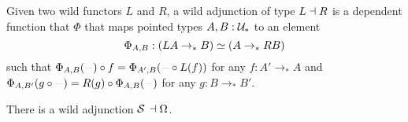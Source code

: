 \documentclass[english,a4]{article}
\newcommand{\ptdto}{\to_\ast}%
\newcommand{\UUptd}{\UU_{\ast}}
\begin{document}
\begin{definition}
  Given two wild functors $L$ and $R$, a wild adjunction of type $L\dashv
  R$ is a dependent function that $\Phi$ that maps pointed types $A,B:\UUptd$
  to an element
  \begin{displaymath}
    \Phi_{A,B} : (LA\ptdto B) \weq (A\ptdto RB)
  \end{displaymath}
  such that $\Phi_{A,B}(\blank) \circ f = \Phi_{A',B} (\blank \circ L(f))$ for
  any $f:A'\ptdto A$ and $\Phi_{A,B'}(g\circ\blank) = R(g)\circ \Phi_{A,B}
  (\blank)$ for any $g:B\ptdto B'$.
  \label{def:wild-adj}
\end{definition}

\begin{proposition}
  There is a wild adjunction $\susp \null \leftadjto \loopspace \null$.
  \label{prop:susp-loop-adjunction}
\end{proposition}
\end{document}
